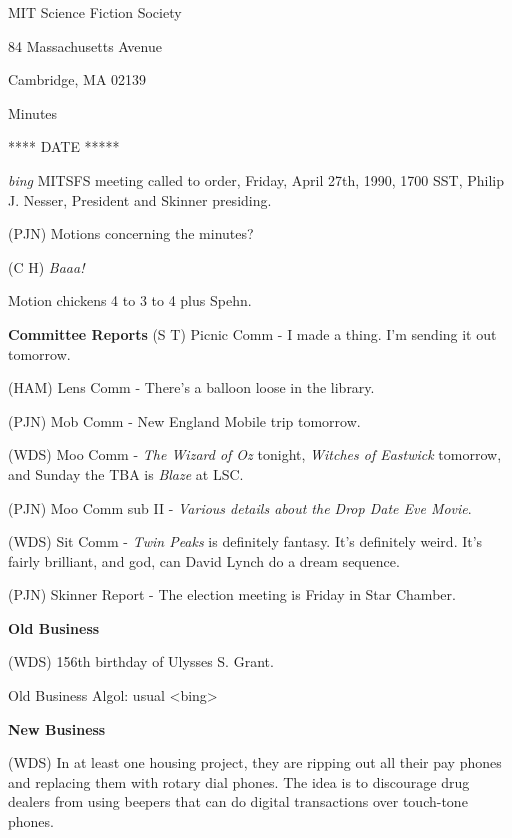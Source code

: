 \setlength{\topmargin}{-0.5in}
\setlength{\oddsidemargin}{0.0in}
\setlength{\evensidemargin}{0.0in}
\setlength{\textheight}{9in}
\setlength{\textwidth}{6.5in}



\begin{center}
MIT Science Fiction Society

84 Massachusetts Avenue

Cambridge, MA 02139

\vspace{0.2in}
Minutes

**** DATE *****

\end{center}
 
\vspace{0.15in}
{\em bing\/}  MITSFS meeting called to order, Friday, April 27th, 1990,
1700 SST, Philip J. Nesser, President and Skinner presiding.

(PJN) Motions concerning the minutes?

(C H) {\em Baaa!}

Motion chickens 4 to 3 to 4 plus Spehn.

\vspace{0.15in}
{\bf Committee Reports}
(S T) Picnic Comm - I made a thing.  I'm sending it out tomorrow.

(HAM) Lens Comm - There's a balloon loose in the library.

(PJN) Mob Comm - New England Mobile trip tomorrow.

(WDS) Moo Comm - {\em The Wizard of Oz} tonight, {\em Witches of
Eastwick} tomorrow, and Sunday the TBA is {\em Blaze} at LSC.

(PJN) Moo Comm sub II - {\em Various details about the Drop Date Eve
Movie}.

(WDS) Sit Comm - {\em Twin Peaks} is definitely fantasy.  It's
definitely weird.  It's fairly brilliant, and god, can David Lynch do
a dream sequence.

(PJN) Skinner Report - The election meeting is Friday in Star Chamber.

\vspace{0.15in}
{\bf Old Business}

(WDS) 156th birthday of Ulysses S. Grant.

Old Business Algol: usual <bing>

\vspace{0.15in}
{\bf New Business}

(WDS) In at least one housing project, they are ripping out all their
pay phones and replacing them with rotary dial phones.  The idea is to
discourage drug dealers from using beepers that can do digital
transactions over touch-tone phones.

